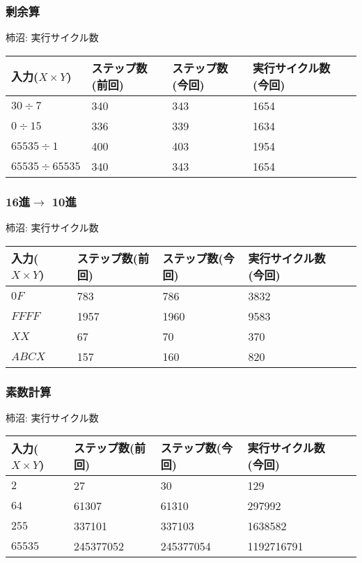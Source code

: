 \documentclass{jsarticle}
\begin{document}
\newpage

\subsubsection*{剰余算}
柿沼:
実行サイクル数
\begin{table}[h]
  \begin{tabular}{|l|l|l|l|l|} \hline
    入力($X \times Y$) & ステップ数(前回) & ステップ数(今回) & 実行サイクル数(今回) \\ \hline
    $30 \div 7$ & 340 & 343 & 1654 \\ \hline
    $0 \div 15$ & 336 & 339 & 1634 \\ \hline
    $65535 \div 1$ & 400 & 403 & 1954 \\ \hline
    $65535 \div 65535$ & 340 & 343 & 1654 \\ \hline
  \end{tabular}
\end{table}



\subsubsection*{16進$\rightarrow$ 10進}
柿沼:
実行サイクル数
\begin{table}[h]
  \begin{tabular}{|l|l|l|l|l|} \hline
    入力($X \times Y$) & ステップ数(前回) & ステップ数(今回) & 実行サイクル数(今回) \\ \hline
    $0F$ & 783 & 786 & 3832 \\ \hline
    $FFFF$ & 1957 & 1960 & 9583 \\ \hline
    $XX$ & 67 & 70 & 370 \\ \hline
    $ABCX$ & 157 & 160 & 820 \\ \hline
  \end{tabular}
\end{table}

\subsubsection*{素数計算}
柿沼:
実行サイクル数
\begin{table}[h]
  \begin{tabular}{|l|l|l|l|l|} \hline
    入力($X \times Y$) & ステップ数(前回) & ステップ数(今回) & 実行サイクル数(今回) \\ \hline
    $2$ & 27 & 30 & 129 \\ \hline
    $64$ & 61307 & 61310 & 297992 \\ \hline
    $255$ & 337101 & 337103\footnotemark[1] & 1638582\footnotemark[1] \\ \hline
    $65535$ & 245377052 & 245377054\footnotemark[1] & 1192716791\footnotemark[1] \\ \hline
  \end{tabular}
\end{table}
\end{document}
